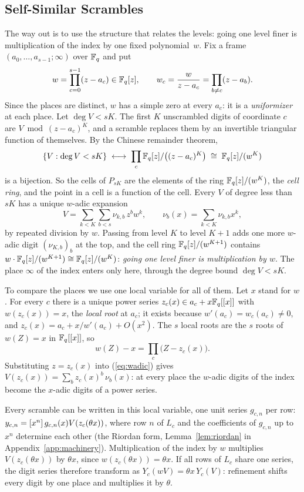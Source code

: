 \subsection{Self-Similar Scrambles}
The way out is to use the structure that relates the levels: going one level finer is multiplication of the index by one fixed polynomial~$w$. Fix a frame $(a_0,\dots,a_{s-1};\infty)$ over $\mathbb{F}_q$ and put
\[
w=\prod_{c=0}^{s-1}(z-a_c)\in\mathbb{F}_q[z],\qquad w_c=\frac{w}{z-a_c}=\prod_{b\ne c}(z-a_b).
\]
Since the places are distinct, $w$ has a simple zero at every $a_c$: it is a \emph{uniformizer} at each place. Let $\deg V<sK$. The first $K$ unscrambled digits of coordinate $c$ are $V\bmod(z-a_c)^K$, and a scramble replaces them by an invertible triangular function of themselves. By the Chinese remainder theorem,
\[
\{V:\deg V<sK\}\;\longleftrightarrow\;\prod_c\mathbb{F}_q[z]/\bigl((z-a_c)^K\bigr)\;\cong\;\mathbb{F}_q[z]/(w^K)
\]
is a bijection. So the cells of $P_{sK}$ are the elements of the ring $\mathbb{F}_q[z]/(w^K)$, the \emph{cell ring}, and the point in a cell is a function of the cell. Every $V$ of degree less than $sK$ has a unique $w$-adic expansion
\begin{equation}\label{eq:wadic}
V=\sum_{k<K}\sum_{b<s}\nu_{k,b}\,z^bw^k,\qquad \nu_b(x)=\sum_{k<K}\nu_{k,b}x^k,
\end{equation}
by repeated division by $w$. Passing from level $K$ to level $K+1$ adds one more $w$-adic digit $(\nu_{K,b})_b$ at the top, and the cell ring $\mathbb{F}_q[z]/(w^{K+1})$ contains $w\cdot\mathbb{F}_q[z]/(w^{K+1})\cong\mathbb{F}_q[z]/(w^K)$: \emph{going one level finer is multiplication by $w$}. The place $\infty$ of the index enters only here, through the degree bound $\deg V<sK$.

To compare the places we use one local variable for all of them. Let $x$ stand for $w$. For every $c$ there is a unique power series $z_c(x)\in a_c+x\mathbb{F}_q[[x]]$ with $w(z_c(x))=x$, the \emph{local root} at $a_c$; it exists because $w'(a_c)=w_c(a_c)\ne0$, and $z_c(x)=a_c+x/w'(a_c)+O(x^2)$. The $s$ local roots are the $s$ roots of $w(Z)=x$ in $\mathbb{F}_q[[x]]$, so
\begin{equation}\label{eq:roots}
w(Z)-x=\prod_{c}\bigl(Z-z_c(x)\bigr).
\end{equation}
Substituting $z=z_c(x)$ into (\ref{eq:wadic}) gives $V(z_c(x))=\sum_bz_c(x)^b\,\nu_b(x)$: at every place the $w$-adic digits of the index become the $x$-adic digits of a power series.

Every scramble can be written in this local variable, one unit series $g_{c,n}$ per row: $y_{c,n}=[x^{n}]\,g_{c,n}(x)V(z_c(\theta x))$, where row $n$ of $L_c$ and the coefficients of $g_{c,n}$ up to $x^n$ determine each other (the Riordan form, Lemma~\ref{lem:riordan} in Appendix~\ref{app:machinery}). Multiplication of the index by $w$ multiplies $V(z_c(\theta x))$ by $\theta x$, since $w(z_c(\theta x))=\theta x$. If all rows of $L_c$ share one series, the digit series therefore transform as $Y_c(wV)=\theta x\,Y_c(V)$: refinement shifts every digit by one place and multiplies it by $\theta$.


